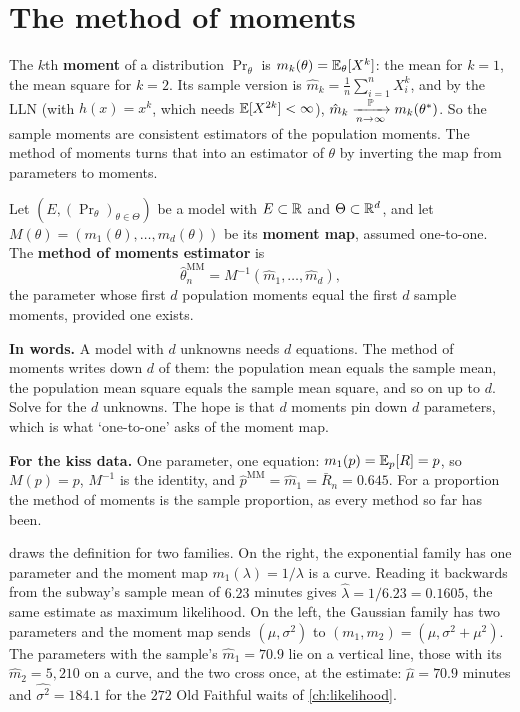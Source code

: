 \section{The method of moments}
\label{sec:mom}


The $k$th \textbf{moment} of a distribution $\Pr_\theta$ is $m_k(\theta) = \operatorname*{\mathbb{E}}_\theta[X^k]$: the mean for $k = 1$, the mean square for $k = 2$.
Its sample version is $\hat{m}_k = \frac1n\sum_{i=1}^n X_i^k$, and by the LLN (with $h(x) = x^k$, which needs $\operatorname*{\mathbb{E}}[X^{2k}] < \infty$), $\hat{m}_k \xrightarrow [n \to \infty ]{\mathbb{P}} m_k(\theta^*)$.
So the sample moments are consistent estimators of the population moments.
The method of moments turns that into an estimator of $\theta$ by inverting the map from parameters to moments.

\begin{definition}
\label{def:mom}
Let $(E, (\Pr_\theta)_{\theta \in \Theta})$ be a model with $E \subset \mathbb{R}$ and $\Theta \subset \mathbb{R}^d$, and let $M(\theta) = (m_1(\theta), \ldots, m_d(\theta))$ be its \textbf{moment map}, assumed one-to-one.
The \textbf{method of moments estimator} is
\[
\hat{\theta}_n^{\text{MM}} = M^{-1}(\hat{m}_1, \ldots, \hat{m}_d),
\]
the parameter whose first $d$ population moments equal the first $d$ sample moments, provided one exists.
\end{definition}

\begin{inwords}
\textbf{In words.} A model with $d$ unknowns needs $d$ equations. The method of moments writes down $d$ of them: the population mean equals the sample mean, the population mean square equals the sample mean square, and so on up to $d$. Solve for the $d$ unknowns. The hope is that $d$ moments pin down $d$ parameters, which is what `one-to-one' asks of the moment map.
\par\smallskip
\textbf{For the kiss data.} One parameter, one equation: $m_1(p) = \operatorname*{\mathbb{E}}_p[R] = p$, so $M(p) = p$, $M^{-1}$ is the identity, and $\hat{p}^{\text{MM}} = \hat{m}_1 = \bar{R}_n = 0.645$. For a proportion the method of moments is the sample proportion, as every method so far has been.
\end{inwords}

 draws the definition for two families.
On the right, the exponential family has one parameter and the moment map $m_1(\lambda) = 1/\lambda$ is a curve.
Reading it backwards from the subway's sample mean of $6.23$ minutes gives $\hat{\lambda} = 1/6.23 = 0.1605$, the same estimate as maximum likelihood.
On the left, the Gaussian family has two parameters and the moment map sends $(\mu, \sigma^2)$ to $(m_1, m_2) = (\mu, \sigma^2 + \mu^2)$.
The parameters with the sample's $\hat{m}_1 = 70.9$ lie on a vertical line, those with its $\hat{m}_2 = 5{,}210$ on a curve, and the two cross once, at the estimate: $\hat{\mu} = 70.9$ minutes and $\widehat{\sigma^2} = 184.1$ for the $272$ Old Faithful waits of \cref{ch:likelihood}.


